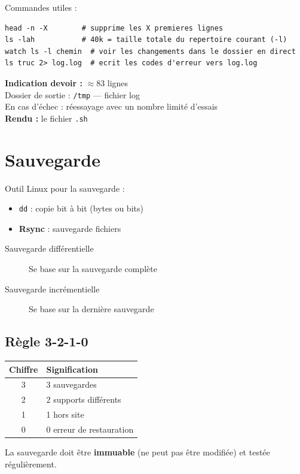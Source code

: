 \documentclass[a4paper,12pt]{article}
\begin{document}
Commandes utiles :
\begin{lstlisting}
head -n -X        # supprime les X premieres lignes
ls -lah           # 40k = taille totale du repertoire courant (-l)
watch ls -l chemin  # voir les changements dans le dossier en direct
ls truc 2> log.log  # ecrit les codes d'erreur vers log.log
\end{lstlisting}

\textbf{Indication devoir :} $\approx 83$ lignes\\
Dossier de sortie : \texttt{/tmp} — fichier log\\
En cas d'échec : réessayage avec un nombre limité d'essais\\
\textbf{Rendu :} le fichier \texttt{.sh}

\section{Sauvegarde}

Outil Linux pour la sauvegarde :
\begin{itemize}
    \item \texttt{dd} : copie bit à bit (bytes ou bits)
    \item \textbf{Rsync} : sauvegarde fichiers
\end{itemize}

\begin{description}
    \item[Sauvegarde différentielle] Se base sur la sauvegarde complète
    \item[Sauvegarde incrémentielle] Se base sur la dernière sauvegarde
\end{description}

\subsection{Règle 3-2-1-0}

\begin{center}
\begin{tabular}{|c|l|}
    \hline
    \textbf{Chiffre} & \textbf{Signification} \\
    \hline
    3 & 3 sauvegardes \\
    2 & 2 supports différents \\
    1 & 1 hors site \\
    0 & 0 erreur de restauration \\
    \hline
\end{tabular}
\end{center}

La sauvegarde doit être \textbf{immuable} (ne peut pas être modifiée) et testée régulièrement.
\end{document}
